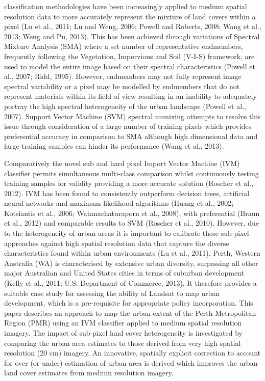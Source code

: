 \documentclass[]{book}
\begin{document}
classification methodologies have been increasingly applied to medium
spatial resolution data to more accurately represent the mixture of land
covers within a pixel (Lu et al., 2011; Lu and Weng, 2006; Powell and
Roberts, 2008; Wang et al., 2013; Weng and Pu, 2013). This has been
achieved through variations of Spectral Mixture Analysis (SMA) where a
set number of representative endmembers, frequently following the
Vegetation, Impervious and Soil (V-I-S) framework, are used to model the
entire image based on their spectral characteristics (Powell et al.,
2007; Ridd, 1995). However, endmembers may not fully represent image
spectral variability or a pixel may be modelled by endmembers that do
not represent materials within its field of view resulting in an
inability to adequately portray the high spectral heterogeneity of the
urban landscape (Powell et al., 2007). Support Vector Machine (SVM)
spectral unmixing attempts to resolve this issue through consideration
of a large number of training pixels which provides preferential
accuracy in comparison to SMA although high dimensional data and large
training samples can hinder its performance (Wang et al., 2013).

Comparatively the novel sub and hard pixel Import Vector Machine (IVM)
classifier permits simultaneous multi-class comparison whilst
continuously testing training samples for validity providing a more
accurate solution (Roscher et al., 2012). IVM has been found to
consistently outperform decision trees, artificial neural networks and
maximum likelihood algorithms (Huang et al., 2002; Kotsiantis et al.,
2006; Watanachaturaporn et al., 2008), with preferential (Braun et al.,
2012) and comparable results to SVM (Roscher et al., 2010). However, due
to the heterogeneity of urban areas it is important to calibrate these
sub-pixel approaches against high spatial resolution data that capture
the diverse characteristics found within urban environments (Lu et al.,
2011). Perth, Western Australia (WA) is characterised by extensive urban
diversity, surpassing all other major Australian and United States
cities in terms of suburban development (Kelly et al., 2011; U.S.
Department of Commerce, 2013). It therefore provides a suitable case
study for assessing the ability of Landsat to map urban development,
which is a pre-requisite for appropriate policy incorporation. This
paper describes an approach to map the urban extent of the Perth
Metropolitan Region (PMR) using an IVM classifier applied to medium
spatial resolution imagery. The impact of sub-pixel land cover
heterogeneity is investigated by comparing the urban area estimates to
those derived from very high spatial resolution (20 cm) imagery. An
innovative, spatially explicit correction to account for over (or under)
estimation of urban area is derived which improves the urban land cover
estimates from medium resolution imagery.
\end{document}
